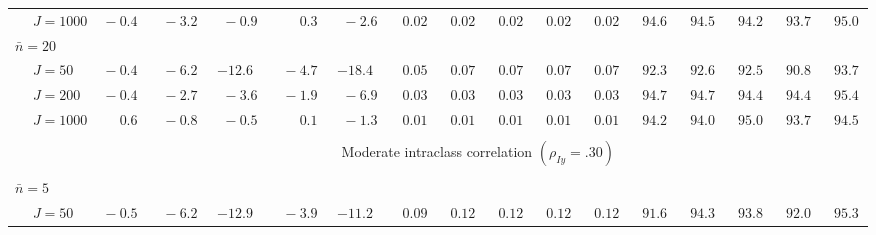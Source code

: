 \begin{sidewaystable}
\begin{threeparttable}
\begin{tabular}{llccccccccccccccc}
 & \nopagebreak $\;J=1000$  & $\phantom{0}{-}0.4\phantom{0}$ & $\phantom{0}{-}3.2\phantom{0}$ & $\phantom{0}{-}0.9\phantom{0}$ & $\phantom{0}\phantom{-}0.3\phantom{0}$ & $\phantom{0}{-}2.6\phantom{0}$ & $\phantom{0}0.02\phantom{0}$ & $\phantom{0}0.02\phantom{0}$ & $\phantom{0}0.02\phantom{0}$ & $\phantom{0}0.02\phantom{0}$ & $\phantom{0}0.02\phantom{0}$ & $\phantom{0}94.6\phantom{0}$ & $\phantom{0}94.5\phantom{0}$ & $\phantom{0}94.2\phantom{0}$ & $\phantom{0}93.7\phantom{0}$ & $\phantom{0}95.0\phantom{0}$ \\
\multicolumn{4}{l}{$\bar{n}=20$} \\  & \nopagebreak $\;J=50$  & $\phantom{0}{-}0.4\phantom{0}$ & $\phantom{0}{-}6.2\phantom{0}$ & ${-}12.6\phantom{0}$ & $\phantom{0}{-}4.7\phantom{0}$ & ${-}18.4\phantom{0}$ & $\phantom{0}0.05\phantom{0}$ & $\phantom{0}0.07\phantom{0}$ & $\phantom{0}0.07\phantom{0}$ & $\phantom{0}0.07\phantom{0}$ & $\phantom{0}0.07\phantom{0}$ & $\phantom{0}92.3\phantom{0}$ & $\phantom{0}92.6\phantom{0}$ & $\phantom{0}92.5\phantom{0}$ & $\phantom{0}90.8\phantom{0}$ & $\phantom{0}93.7\phantom{0}$ \\
 & \nopagebreak $\;J=200$  & $\phantom{0}{-}0.4\phantom{0}$ & $\phantom{0}{-}2.7\phantom{0}$ & $\phantom{0}{-}3.6\phantom{0}$ & $\phantom{0}{-}1.9\phantom{0}$ & $\phantom{0}{-}6.9\phantom{0}$ & $\phantom{0}0.03\phantom{0}$ & $\phantom{0}0.03\phantom{0}$ & $\phantom{0}0.03\phantom{0}$ & $\phantom{0}0.03\phantom{0}$ & $\phantom{0}0.03\phantom{0}$ & $\phantom{0}94.7\phantom{0}$ & $\phantom{0}94.7\phantom{0}$ & $\phantom{0}94.4\phantom{0}$ & $\phantom{0}94.4\phantom{0}$ & $\phantom{0}95.4\phantom{0}$ \\
 & \nopagebreak $\;J=1000$  & $\phantom{0}\phantom{-}0.6\phantom{0}$ & $\phantom{0}{-}0.8\phantom{0}$ & $\phantom{0}{-}0.5\phantom{0}$ & $\phantom{0}\phantom{-}0.1\phantom{0}$ & $\phantom{0}{-}1.3\phantom{0}$ & $\phantom{0}0.01\phantom{0}$ & $\phantom{0}0.01\phantom{0}$ & $\phantom{0}0.01\phantom{0}$ & $\phantom{0}0.01\phantom{0}$ & $\phantom{0}0.01\phantom{0}$ & $\phantom{0}94.2\phantom{0}$ & $\phantom{0}94.0\phantom{0}$ & $\phantom{0}95.0\phantom{0}$ & $\phantom{0}93.7\phantom{0}$ & $\phantom{0}94.5\phantom{0}$ \\
[0.5ex]\hline\\[-1.6ex] 
& & \multicolumn{15}{c}{Moderate intraclass correlation $(\rho_{Iy}=.30)$} \\[0.6ex]\hline\\[-1.8ex]
\multicolumn{4}{l}{$\bar{n}=5$} \\  & \nopagebreak $\;J=50$  & $\phantom{0}{-}0.5\phantom{0}$ & $\phantom{0}{-}6.2\phantom{0}$ & ${-}12.9\phantom{0}$ & $\phantom{0}{-}3.9\phantom{0}$ & ${-}11.2\phantom{0}$ & $\phantom{0}0.09\phantom{0}$ & $\phantom{0}0.12\phantom{0}$ & $\phantom{0}0.12\phantom{0}$ & $\phantom{0}0.12\phantom{0}$ & $\phantom{0}0.12\phantom{0}$ & $\phantom{0}91.6\phantom{0}$ & $\phantom{0}94.3\phantom{0}$ & $\phantom{0}93.8\phantom{0}$ & $\phantom{0}92.0\phantom{0}$ & $\phantom{0}95.3\phantom{0}$ \\

\end{tabular}
\end{threeparttable}
\end{sidewaystable}
